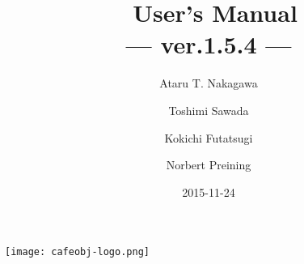 \documentclass[a4paper]{memoir}
\begin{document}
\tightlists
\midsloppy
{}
\frontmatter
\pagestyle{empty}
\title{\cafeobj~User's Manual \\ --- ver.1.5.4 ---}
\author{Ataru T. Nakagawa \and Toshimi Sawada \and Kokichi Futatsugi
  \and Norbert Preining}
\date{2015-11-24}


\maketitle
\vfill
\begin{center}
\texttt{[image: cafeobj-logo.png]}
\end{center}
\vfill
\thispagestyle{empty}


\clearpage
\newpage
\pagestyle{headings}
\tableofcontents
\clearpage

\pagestyle{ruled}
\end{document}
